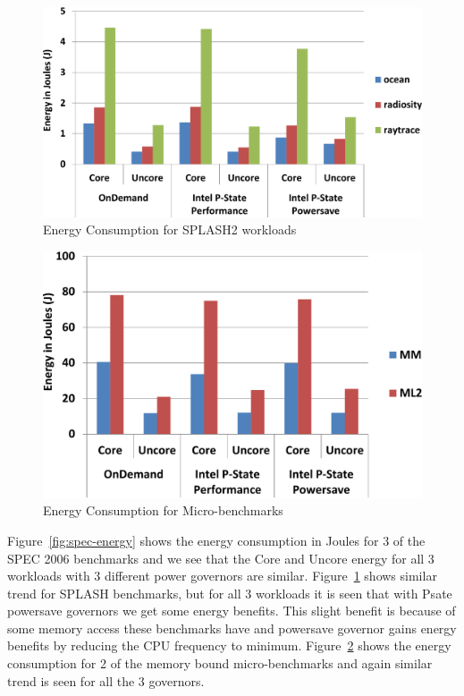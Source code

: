 \begin{figure}
  \begin{center}
\includegraphics[width=\linewidth]{figs/def-drivers-splash-crop.pdf}
  \end{center}
  \vspace{-0.1in}
  \caption{Energy Consumption for SPLASH2 workloads}
  \label{fig:splash-energy}
\end{figure}
\fi

\begin{figure}[h]
  \begin{center}
\includegraphics[width=\linewidth]{figs/def-drivers-micro-crop.pdf}
  \end{center}
  \vspace{-0.1in}
  \caption{Energy Consumption for Micro-benchmarks}
	\label{fig:micro-energy}
\end{figure}
\fi

Figure~\ref{fig:spec-energy} shows the energy consumption in Joules for 3 of the SPEC 2006
benchmarks and we see that the Core and Uncore energy for all 3 workloads with 3 different
power governors are similar. 
Figure~\ref{fig:splash-energy} shows similar trend for SPLASH benchmarks,
but for all 3 workloads it is seen that with Psate powersave governors we get some energy benefits.
This slight benefit is because of some memory access these benchmarks have and powersave governor
gains energy benefits by reducing the CPU frequency to minimum. 
Figure~\ref{fig:micro-energy} shows
the energy consumption for 2 of the memory bound micro-benchmarks and again similar trend is seen
for all the 3 governors.

